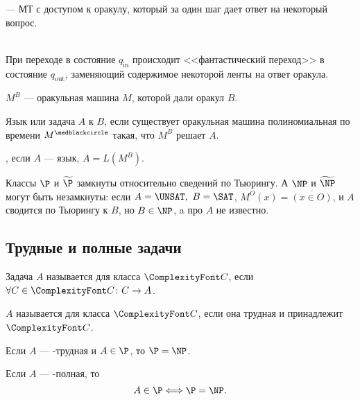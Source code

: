 \begin{defn}[Оракульная МТ]
	 --- МТ с доступом к оракулу, который за один шаг дает ответ на некоторый вопрос.
\end{defn}
\begin{name}
	~\\
	При переходе в состояние $ q_{\text{in}}$ происходит <<фантастический переход>> в состояние $ q_{\text{out}}$, заменяющий содержимое некоторой ленты на ответ оракула.

	\noindent$ M^{B}$ --- оракульная машина $ M$, которой дали оракул $ B$. 
\end{name}

\begin{defn}
	Язык или задача $ A$  к $ B$, если существует оракульная машина полиномиальная по времени $ M^{\medblackcircle}$ такая, что $ M^{B}$ решает $ A$.

	, если  $ A$ ---  язык, $ A = L(M^{B})$.
\end{defn}
\begin{ex}
	Классы $\P$ и $\tP$ замкнуты относительно сведений по Тьюрингу. А $\NP$ и $\tNP$ могут быть незамкнуты: если $A = \UNSAT,~ B = \SAT$, $ M^{O}(x) = \overline{(x \in O)}$, и $ A$ сводится по Тьюрингу к $ B$, но $ B \in \NP$, a про $ A$ не известно.
\end{ex}

\subsection{Трудные и полные задачи}
\begin{defn}
	Задача $ A$ называется  для класса $\Class$, если  $ \forall C \in \Class \colon C \to A$.

	 $ A$ называется  для класса $ \Class$, если она трудная и принадлежит $ \Class$.
\end{defn}

\begin{thm}
    Если $ A$ --- \NP-трудная и $ A \in \P$, то $ \P = \NP$.
\end{thm}
\begin{cor}
    Если $ A$ --- \NP-полная, то \[
    A \in \P \Longleftrightarrow \P = \NP
    .\] 
\end{cor}

